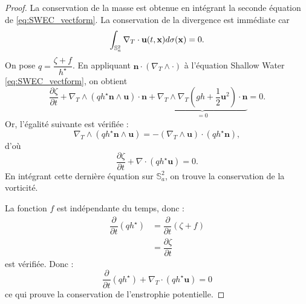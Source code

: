 \begin{proof}
La conservation de la masse est obtenue en intégrant la seconde équation de \eqref{eq:SWEC_vectform}.
La conservation de la divergence est immédiate car
\begin{equation}
\displaystyle\int_{\mathbb{S}_a^2} \nabla_T \cdot \mathbf{u}(t,\mathbf{x}) d \sigma(\mathbf{x}) = 0.
\end{equation}
On pose $q = \dfrac{\zeta + f}{h^{\star}}$. En appliquant $\mathbf{n} \cdot ( \nabla_T \wedge \cdot )$ à l'équation Shallow Water \eqref{eq:SWEC_vectform}, on obtient
\begin{equation}
\dfrac{\partial \zeta}{\partial t}+\nabla_T \wedge \left( q h^{\star} \mathbf{n} \wedge \mathbf{u} \right) \cdot\mathbf{n} + \underbrace{\nabla_T \wedge \nabla_T \left( gh + \dfrac{1}{2}\mathbf{u}^2 \right) \cdot \mathbf{n}}_{=0} = 0 .
\end{equation}
Or, l'égalité suivante est vérifiée :
\begin{equation}
\nabla_T \wedge (q h^{\star} \mathbf{n} \wedge \mathbf{u}) = - (\nabla_T \wedge \mathbf{u}) \cdot (q h^{\star} \mathbf{n}),
\end{equation}
d'où
\begin{equation}
\dfrac{ \partial \zeta}{\partial t} + \nabla \cdot \left( q h^{\star} \mathbf{u} \right) = 0.
\end{equation}
En intégrant cette dernière équation sur $\mathbb{S}_a^2$, on trouve la conservation de la vorticité.

La fonction $f$ est indépendante du temps, donc :
\begin{align*}
\dfrac{\partial}{\partial t} \left( qh^{\star} \right) & = \dfrac{\partial}{\partial t} ( \zeta + f) \\
& = \dfrac{\partial \zeta}{\partial t}
\end{align*}
est vérifiée. Donc :
\begin{equation}
\dfrac{\partial}{\partial t} \left( qh^{\star} \right) + \nabla_T \cdot \left( q h^{\star} \mathbf{u} \right) = 0
\end{equation}
ce qui prouve la conservation de l'enstrophie potentielle.


\end{proof}
